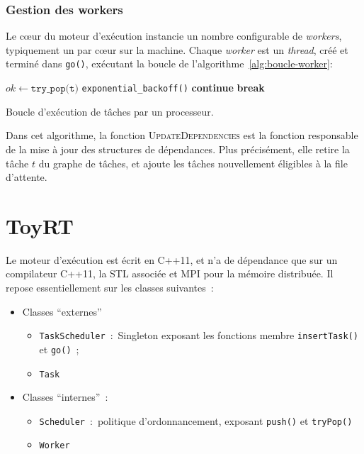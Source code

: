 \documentclass[11pt]{article}
\theoremstyle{plain} %
\theoremstyle{definition} %
\begin{document}
\subsubsection{Gestion des workers}
\label{sec:gestion-des-workers}
Le c\oe{}ur du moteur d'exécution instancie un nombre configurable de \emph{workers}, typiquement un par c\oe{}ur sur la machine.
Chaque \emph{worker} est un \emph{thread}, créé et terminé dans \texttt{go()}, exécutant la boucle de l'algorithme~\ref{alg:boucle-worker}:

\begin{algorithm}[!htpb]
    \begin{algorithmic}
    \State $ok \gets \texttt{try\_pop(t)}$
    \State \texttt{exponential\_backoff()}
    \State \textbf{continue}
    \EndIf
    \State \textbf{break}
    \EndIf
    \State {}
    \State {}
    \EndWhile
  \end{algorithmic}
  \caption{\label{alg:boucle-worker}Boucle d'exécution de tâches par un processeur.}
\end{algorithm}

Dans cet algorithme, la fonction \textsc{UpdateDependencies} est la fonction responsable de la mise à jour des structures de dépendances.
Plus précisément, elle retire la tâche $t$ du graphe de tâches, et ajoute les tâches nouvellement éligibles à la file d'attente.

\section{ToyRT}
\label{sec:runtime}
Le moteur d'exécution est écrit en C++11, et n'a de dépendance que sur un compilateur C++11, la STL associée et MPI pour la mémoire distribuée.
Il repose essentiellement sur les classes suivantes~:~
\begin{itemize}
\item Classes ``externes''
  \begin{itemize}
  \item \texttt{TaskScheduler}~:~Singleton exposant les fonctions membre \texttt{insertTask()} et \texttt{go()}~;
  \item \texttt{Task}
  \end{itemize}
\item Classes ``internes''~:~
  \begin{itemize}
  \item \texttt{Scheduler}~:~politique d'ordonnancement, exposant \texttt{push()} et \texttt{tryPop()}
  \item \texttt{Worker}
  \end{itemize}
\end{itemize}
\end{document}
